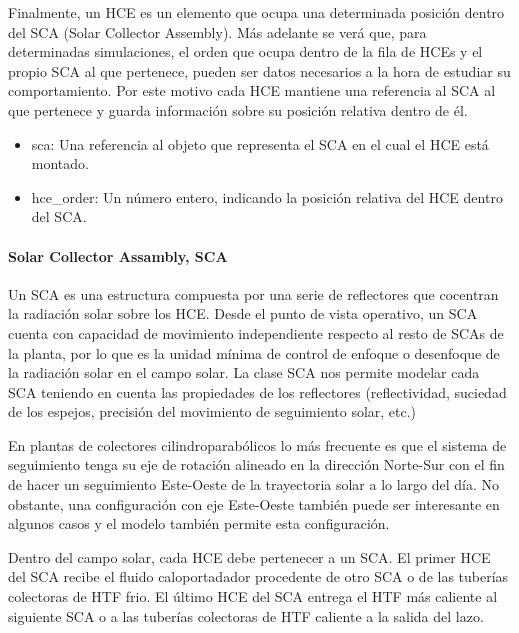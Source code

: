 \documentclass[11pt]{article}
\providecommand{\tightlist}{%
      \setlength{\itemsep}{0pt}\setlength{\parskip}{0pt}}
\begin{document}
Finalmente, un HCE es un elemento que ocupa una determinada posición
dentro del SCA (Solar Collector Assembly). Más adelante se verá que,
para determinadas simulaciones, el orden que ocupa dentro de la fila de
HCEs y el propio SCA al que pertenece, pueden ser datos necesarios a la
hora de estudiar su comportamiento. Por este motivo cada HCE mantiene
una referencia al SCA al que pertenece y guarda información sobre su
posición relativa dentro de él.

\begin{itemize}
\tightlist
\item
  sca: Una referencia al objeto que representa el SCA en el cual el HCE
  está montado.
\item
  hce\_order: Un número entero, indicando la posición relativa del HCE
  dentro del SCA.
\end{itemize}

\hypertarget{solar-collector-assambly-sca}{%
\paragraph{Solar Collector Assambly,
SCA}\label{solar-collector-assambly-sca}}

Un SCA es una estructura compuesta por una serie de reflectores que
cocentran la radiación solar sobre los HCE. Desde el punto de vista
operativo, un SCA cuenta con capacidad de movimiento independiente
respecto al resto de SCAs de la planta, por lo que es la unidad mínima
de control de enfoque o desenfoque de la radiación solar en el campo
solar. La clase SCA nos permite modelar cada SCA teniendo en cuenta las
propiedades de los reflectores (reflectividad, suciedad de los espejos,
precisión del movimiento de seguimiento solar, etc.)

En plantas de colectores cilindroparabólicos lo más frecuente es que el
sistema de seguimiento tenga su eje de rotación alineado en la dirección
Norte-Sur con el fin de hacer un seguimiento Este-Oeste de la
trayectoria solar a lo largo del día. No obstante, una configuración con
eje Este-Oeste también puede ser interesante en algunos casos y el
modelo también permite esta configuración.

Dentro del campo solar, cada HCE debe pertenecer a un SCA. El primer HCE
del SCA recibe el fluido caloportadador procedente de otro SCA o de las
tuberías colectoras de HTF frio. El último HCE del SCA entrega el HTF
más caliente al siguiente SCA o a las tuberías colectoras de HTF
caliente a la salida del lazo.
\end{document}
